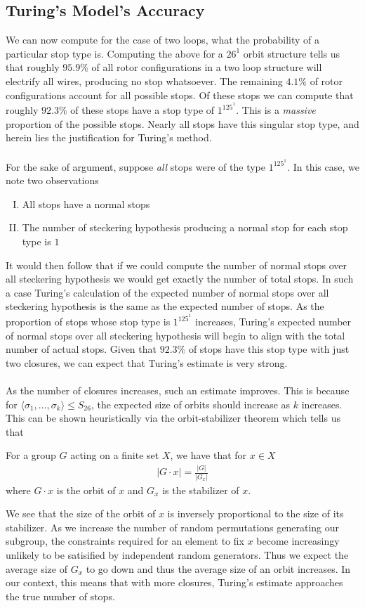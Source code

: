 \subsection{Turing's Model's Accuracy}\label{justify_turing}
We can now compute for the case of two loops, what the probability of a particular stop type is. Computing the above for a $26^1$ orbit structure tells us that roughly $95.9\%$ of all rotor configurations in a two loop structure will electrify all wires, producing no stop whatsoever. The remaining $4.1\%$ of rotor configurations account for all possible stops. Of these stops we can compute that roughly $92.3\%$ of these stops have a stop type of $1^125^1$. This is a \emph{massive} proportion of the possible stops. Nearly all stops have this singular stop type, and herein lies the justification for Turing's method.
\\\\For the sake of argument, suppose \emph{all} stops were of the type $1^125^1$. In this case, we note two observations
\begin{enumerate}[(I)]
	\item All stops have a normal stops
	\item The number of steckering hypothesis producing a normal stop for each stop type is $1$
\end{enumerate}
It would then follow that if we could compute the number of normal stops over all steckering hypothesis we would get exactly the number of total stops. In such a case Turing's calculation of the expected number of normal stops over all steckering hypothesis is the same as the expected number of stops. As the proportion of stops whose stop type is $1^125^1$ increases, Turing's expected number of normal stops over all steckering hypothesis will begin to align with the total number of actual stops. Given that $92.3\%$ of stops have this stop type with just two closures, we can expect that Turing's estimate is very strong.
\\\\As the number of closures increases, such an estimate improves. This is because for $\langle \sigma_1, \dots, \sigma_k\rangle\le S_{26}$, the expected size of orbits should increase as $k$ increases. This can be shown heuristically via the orbit-stabilizer theorem which tells us that
\begin{theorem}
	For a group $G$ acting on a finite set $X$, we have that for $x\in X$
	\begin{align*}
		|G\cdot x| = \frac{|G|}{|G_x|}
	\end{align*}
	where $G\cdot x$ is the orbit of $x$ and $G_x$ is the stabilizer of $x$.
\end{theorem}
\noindent We see that the size of the orbit of $x$ is inversely proportional to the size of its stabilizer. As we increase the number of random permutations generating our subgroup, the  constraints required for an element to fix $x$ become increasingy unlikely to be satisified by independent random generators. Thus we expect the average size of $G_x$ to go down and thus the average size of an orbit increases. In our context, this means that with more closures, Turing's estimate approaches the true number of stops.

